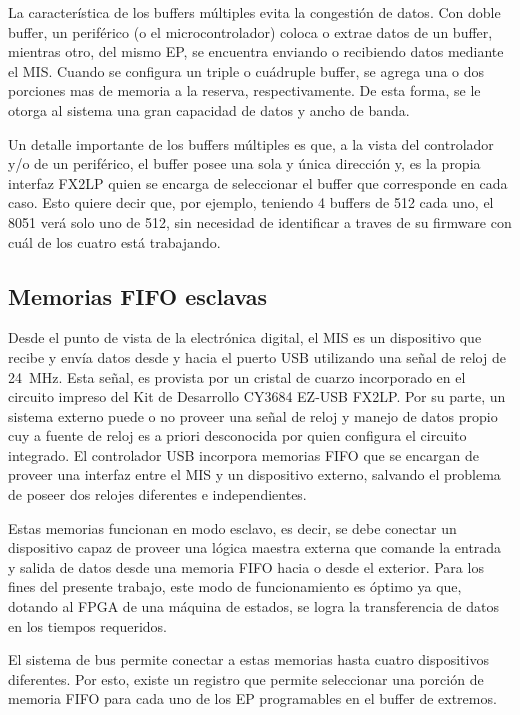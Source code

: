 	La característica de los buffers múltiples evita la congestión de datos. Con doble buffer, un periférico (o el microcontrolador) coloca o extrae datos de un buffer, mientras otro, del mismo EP, se encuentra enviando o recibiendo datos mediante el MIS. Cuando se configura un triple o cuádruple buffer, se agrega una o dos porciones mas de memoria a la reserva, respectivamente. De esta forma, se le otorga al sistema una gran capacidad de datos y ancho de banda.%
	
	Un detalle importante de los buffers múltiples es que, a la vista del controlador y/o de un periférico, el buffer posee una sola y única dirección y, es la propia interfaz FX2LP quien se encarga de seleccionar el buffer que corresponde en cada caso. Esto quiere decir que, por ejemplo, teniendo 4 buffers de \SI{512}{\byte} cada uno, el 8051 verá solo uno de \SI{512}{\byte}, sin necesidad de identificar a traves de su firmware con cuál de los cuatro está trabajando.
	
\subsection{Memorias FIFO esclavas}
	\label{cy:fifo}
	Desde el punto de vista de la electrónica digital, el MIS es un dispositivo que recibe y envía datos desde y hacia el puerto USB utilizando una señal de reloj de \SI{24}{\mega\hertz}. Esta señal, es provista por un cristal de cuarzo incorporado en el circuito impreso del Kit de Desarrollo CY3684 EZ-USB FX2LP. Por su parte, un sistema externo puede o no proveer una señal de reloj y manejo de datos propio cuy a fuente de reloj es a priori desconocida por quien configura el circuito integrado. El controlador USB incorpora memorias FIFO que se encargan de proveer una interfaz entre el MIS y un dispositivo externo, salvando el problema de poseer dos relojes diferentes e independientes.%
	
	Estas memorias funcionan en modo esclavo, es decir, se debe conectar un dispositivo capaz de proveer una lógica maestra externa que comande la entrada y salida de datos desde una memoria FIFO hacia o desde el exterior. Para los fines del presente trabajo, este modo de funcionamiento es óptimo ya que, dotando al FPGA de una máquina de estados, se logra la transferencia de datos en los tiempos requeridos.%
	
	El sistema de bus permite conectar a estas memorias hasta cuatro dispositivos diferentes. Por esto, existe un registro que permite seleccionar una porción de memoria FIFO para cada uno de los EP programables en el buffer de extremos.%
	

